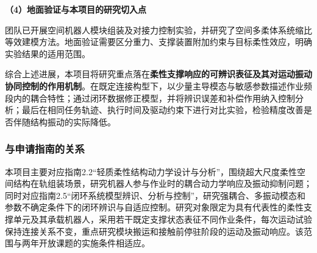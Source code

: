 \documentclass[UTF8,a4paper,zihao=-4,fontset=fandol]{ctexart}
\newcommand{\topic}[1]{\par\addvspace{0.5em}\noindent\textbf{#1}\par\nobreak}
\begin{document}
\topic{（4）地面验证与本项目的研究切入点}

团队已开展空间机器人模块组装及对接力控制实验\cite{shi2024}，并研究了空间多柔体系统缩比等效建模方法\cite{qi2025}。地面验证需要区分重力、支撑装置附加约束与目标柔性效应，明确实验结果的适用范围。

综合上述进展，本项目将研究重点落在\textbf{柔性支撑响应的可辨识表征及其对运动振动协同控制的作用机制}。在既定连接构型下，以少量主导模态与敏感参数描述作业频段内的耦合特性；通过闭环数据修正模型，并将辨识误差和补偿作用纳入控制分析；最后在相同任务轨迹、执行时间及驱动约束下进行对比实验，检验精度改善是否伴随结构振动的实际降低。

\subsubsection{与申请指南的关系}

本项目主要对应指南2.2“轻质柔性结构动力学设计与分析”，围绕超大尺度柔性空间结构在轨组装场景，研究机器人参与作业时的耦合动力学响应及振动抑制问题；同时对应指南2.5“闭环系统模型辨识、分析与控制”，研究强耦合、多振动模态和参数不确定条件下的闭环辨识与自适应控制。研究对象限定为具有代表性的柔性支撑单元及其承载机器人，采用若干既定支撑状态表征不同作业条件，每次运动试验保持连接关系不变，重点研究模块搬运和接触前停驻阶段的运动及振动响应。该范围与两年开放课题的实施条件相适应。
\end{document}
